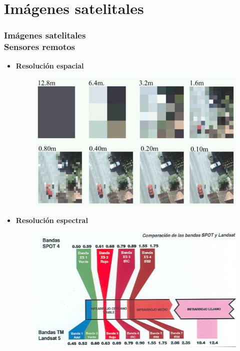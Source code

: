 \documentclass[xcolor=table]{beamer}
\begin{document}
		\section{Im\'agenes satelitales}
		\begin{frame}
			\frametitle{Im\'agenes satelitales\\Sensores remotos}
			\begin{itemize}
				\item \textbf{Resoluci\'on espacial} 
				\begin{figure}[H]
					\centering
					\includegraphics[width=0.4	\textwidth]{imagenes/cap3/resolucion_espacial_n.jpg}
					\label{fig:espatialRes}
				\end{figure}
				\item \textbf{Resoluci\'on espectral} 
				\begin{figure}[H]
					\centering
					\includegraphics[width=0.4	\textwidth]{imagenes/cap3/espectral_spot_landsat.png}
					\label{fig:espectralRes}
				\end{figure}
			\end{itemize}		
			
		\end{frame}
		
\end{document}
